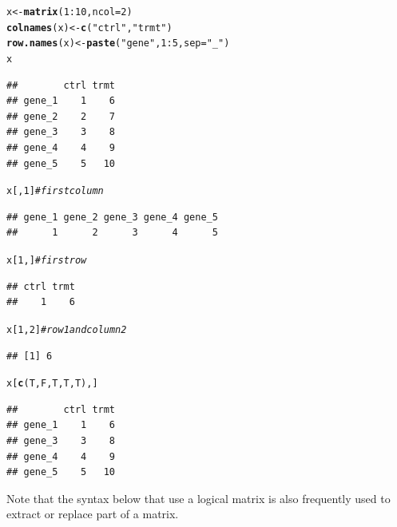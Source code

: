 \documentclass[10pt]{article}\usepackage[]{graphicx}\usepackage[]{color}
\makeatletter
\newcommand{\hlnum}[1]{\textcolor[rgb]{0.686,0.059,0.569}{#1}}%
\newcommand{\hlstr}[1]{\textcolor[rgb]{0.192,0.494,0.8}{#1}}%
\newcommand{\hlcom}[1]{\textcolor[rgb]{0.678,0.584,0.686}{\textit{#1}}}%
\newcommand{\hlopt}[1]{\textcolor[rgb]{0,0,0}{#1}}%
\newcommand{\hlstd}[1]{\textcolor[rgb]{0.345,0.345,0.345}{#1}}%
\newcommand{\hlkwb}[1]{\textcolor[rgb]{0.69,0.353,0.396}{#1}}%
\newcommand{\hlkwc}[1]{\textcolor[rgb]{0.333,0.667,0.333}{#1}}%
\newcommand{\hlkwd}[1]{\textcolor[rgb]{0.737,0.353,0.396}{\textbf{#1}}}%
\newenvironment{kframe}{%
 \def\at@end@of@kframe{}%
 \ifinner\ifhmode%
  \def\at@end@of@kframe{\end{minipage}}%
  \begin{minipage}{\columnwidth}%
 \fi\fi%
 \def\FrameCommand##1{\hskip\@totalleftmargin \hskip-\fboxsep
 \colorbox{shadecolor}{##1}\hskip-\fboxsep
     \hskip-\linewidth \hskip-\@totalleftmargin \hskip\columnwidth}%
 \MakeFramed {\advance\hsize-\width
   \@totalleftmargin\z@ \linewidth\hsize
   \@setminipage}}%
 {\par\unskip\endMakeFramed%
 \at@end@of@kframe}
\newenvironment{knitrout}{}{} %
\makeatother
\begin{document}
\begin{knitrout}
\color{fgcolor}\begin{kframe}
\begin{alltt}
\hlstd{x} \hlkwb{<-} \hlkwd{matrix}\hlstd{(}\hlnum{1}\hlopt{:}\hlnum{10}\hlstd{,}\hlkwc{ncol}\hlstd{=}\hlnum{2}\hlstd{)}
\hlkwd{colnames}\hlstd{(x)} \hlkwb{<-} \hlkwd{c}\hlstd{(}\hlstr{"ctrl"}\hlstd{,}\hlstr{"trmt"}\hlstd{)}
\hlkwd{row.names}\hlstd{(x)} \hlkwb{<-} \hlkwd{paste}\hlstd{(}\hlstr{"gene"}\hlstd{,} \hlnum{1}\hlopt{:}\hlnum{5}\hlstd{,} \hlkwc{sep}\hlstd{=}\hlstr{"_"}\hlstd{)}
\hlstd{x}
\end{alltt}
\begin{verbatim}
##        ctrl trmt
## gene_1    1    6
## gene_2    2    7
## gene_3    3    8
## gene_4    4    9
## gene_5    5   10
\end{verbatim}
\begin{alltt}
\hlstd{x[,}\hlnum{1}\hlstd{]}                       \hlcom{# first column}
\end{alltt}
\begin{verbatim}
## gene_1 gene_2 gene_3 gene_4 gene_5 
##      1      2      3      4      5
\end{verbatim}
\begin{alltt}
\hlstd{x[}\hlnum{1}\hlstd{,]}                       \hlcom{# first row}
\end{alltt}
\begin{verbatim}
## ctrl trmt 
##    1    6
\end{verbatim}
\begin{alltt}
\hlstd{x[}\hlnum{1}\hlstd{,}\hlnum{2}\hlstd{]}                      \hlcom{# row 1 and column 2}
\end{alltt}
\begin{verbatim}
## [1] 6
\end{verbatim}
\begin{alltt}
\hlstd{x[}\hlkwd{c}\hlstd{(T,F,T,T,T),]}
\end{alltt}
\begin{verbatim}
##        ctrl trmt
## gene_1    1    6
## gene_3    3    8
## gene_4    4    9
## gene_5    5   10
\end{verbatim}
\end{kframe}
\end{knitrout}

Note that the syntax below that use a logical matrix is also frequently used to extract or replace part of a matrix.
\end{document}
